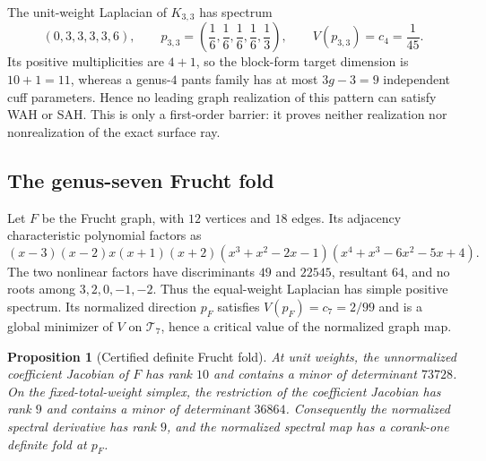 \documentclass[11pt,reqno]{amsart}
\newtheorem{proposition}[theorem]{Proposition}
\theoremstyle{definition}
\theoremstyle{remark}
\begin{document}
The unit-weight Laplacian of $K_{3,3}$ has spectrum
\[
 (0,3,3,3,3,6),\qquad
 p_{3,3}=\left(\frac16,\frac16,\frac16,\frac16,\frac13\right),
 \qquad V(p_{3,3})=c_4=\frac1{45}.
\]
Its positive multiplicities are $4+1$, so the block-form target dimension
is $10+1=11$, whereas a genus-$4$ pants family has at most $3g-3=9$
independent cuff parameters.  Hence no leading graph realization of this
pattern can satisfy WAH or SAH.  This is only a first-order barrier: it proves
neither realization nor nonrealization of the exact surface ray.

\subsection{The genus-seven Frucht fold}

Let $F$ be the Frucht graph, with $12$ vertices and $18$ edges.  Its
adjacency characteristic polynomial factors as
\begin{equation}\label{eq:frucht-factorization}
 (x-3)(x-2)x(x+1)(x+2)
 (x^3+x^2-2x-1)(x^4+x^3-6x^2-5x+4).
\end{equation}
The two nonlinear factors have discriminants $49$ and $22545$, resultant
$64$, and no roots among $3,2,0,-1,-2$.  Thus the equal-weight Laplacian has
simple positive spectrum.  Its normalized direction $p_F$ satisfies
$V(p_F)=c_7=2/99$ and is a global minimizer of $V$ on $\mathcal T_7$,
hence a critical value of the normalized graph map.

\begin{proposition}[Certified definite Frucht fold]\label{prop:frucht-fold}
At unit weights, the unnormalized coefficient Jacobian of $F$ has rank $10$
and contains a minor of determinant $73728$.  On the fixed-total-weight
simplex, the restriction of the coefficient Jacobian has rank $9$ and
contains a minor of determinant $36864$.  Consequently the normalized
spectral derivative has rank $9$, and the normalized spectral map has a
corank-one definite fold at $p_F$.
\end{proposition}
\end{document}
